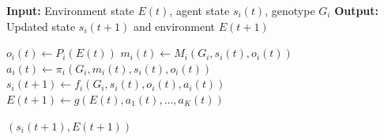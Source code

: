 









\begin{algorithm}[H]
\caption{Agent Update Cycle at Time $t$}
\begin{algorithmic}[1]

\State \textbf{Input:} Environment state $E(t)$, agent state $s_i(t)$, genotype $G_i$
\State \textbf{Output:} Updated state $s_i(t+1)$ and environment $E(t+1)$

\State $o_i(t) \gets P_i(E(t))$ 
\State $m_i(t) \gets M_i(G_i, s_i(t), o_i(t))$ 
\State $a_i(t) \gets \pi_i(G_i, m_i(t), s_i(t), o_i(t))$ 
\State $s_i(t+1) \gets f_i(G_i, s_i(t), o_i(t), a_i(t))$ 
\State $E(t+1) \gets g(E(t), a_1(t), \ldots, a_K(t))$ 

\State \Return $(s_i(t+1), E(t+1))$

\end{algorithmic}
\end{algorithm}
